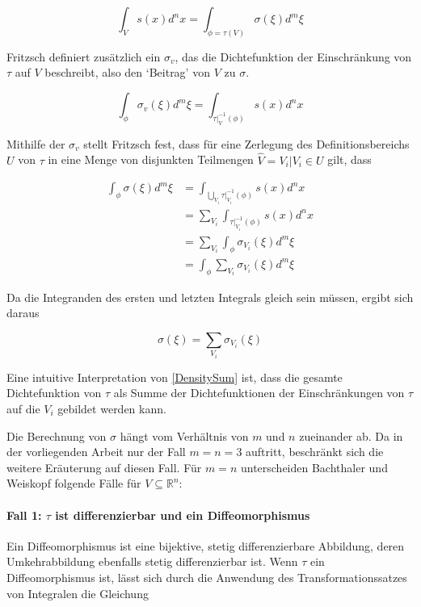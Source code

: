 \documentclass[a4paper,fontsize=12pt,toc=bib,halfparskip,ngerman]{scrartcl}
\begin{document}
\begin{equation}
\int_{V}s(x)d^nx = \int_{\phi = \tau(V)}\sigma(\xi)d^m\xi
\end{equation}

Fritzsch \cite[S.~20~f.]{fritzsch2016continuousScatterplot} definiert zus\"atzlich ein $\sigma_v$, das die Dichtefunktion der Einschr\"ankung von $\tau$ auf $V$ beschreibt, also den `Beitrag' von $V$ zu $\sigma$.

\begin{equation}
\int_{\phi} \sigma_v(\xi)d^m\xi = \int_{\tau|_V^{-1}(\phi)}s(x)d^nx
\end{equation}

Mithilfe der $\sigma_v$ stellt Fritzsch fest, dass f\"ur eine Zerlegung des Definitionsbereichs $U$ von $\tau$ in eine Menge von disjunkten Teilmengen $\hat{V} = {V_i | V_i \in U}$ gilt, dass

\begin{equation}
\begin{split}
\int_{\phi}\sigma(\xi)d^m\xi 
&= \int_{\bigcup\limits_{V_i}\tau|_{V_i}^{-1}(\phi)} s(x)d^nx
\\
&= \sum_{V_i}\int_{\tau|_{V_i}^{-1}(\phi)} s(x)d^nx
\\
&= \sum_{V_i}\int_{\phi}\sigma_{V_i}(\xi)d^m\xi
\\
&= \int_{\phi}\sum_{V_i}\sigma_{V_i}(\xi)d^m\xi
\end{split}
\end{equation}

Da die Integranden des ersten und letzten Integrals gleich sein m\"ussen, ergibt sich daraus

\begin{equation}
\sigma(\xi) = \sum_{V_i}\sigma_{V_i}(\xi)
\label{DensitySum}
\end{equation}

Eine intuitive Interpretation von \cref{DensitySum} ist, dass die gesamte Dichtefunktion von $\tau$ als Summe der Dichtefunktionen der Einschr\"ankungen von $\tau$ auf die $V_i$ gebildet werden kann.

Die Berechnung von $\sigma$ h\"angt vom Verh\"altnis von $m$ und $n$ zueinander ab. Da in der vorliegenden Arbeit nur der Fall $m=n=3$ auftritt, beschr\"ankt sich die weitere Er\"auterung auf diesen Fall. F\"ur $m=n$ unterscheiden Bachthaler und Weiskopf folgende F\"alle f\"ur $V \subseteq \mathbb{R}^n$\cite[S.~1430]{bachthaler2008continuous}:

\paragraph{Fall 1: $\tau$ ist differenzierbar und ein Diffeomorphismus}
Ein Diffeomorphismus ist eine bijektive, stetig differenzierbare Abbildung, deren Umkehrabbildung ebenfalls stetig differenzierbar ist. 
Wenn $\tau$ ein Diffeomorphismus ist, l\"asst sich durch die Anwendung des Transformationssatzes von Integralen die Gleichung 
\end{document}
